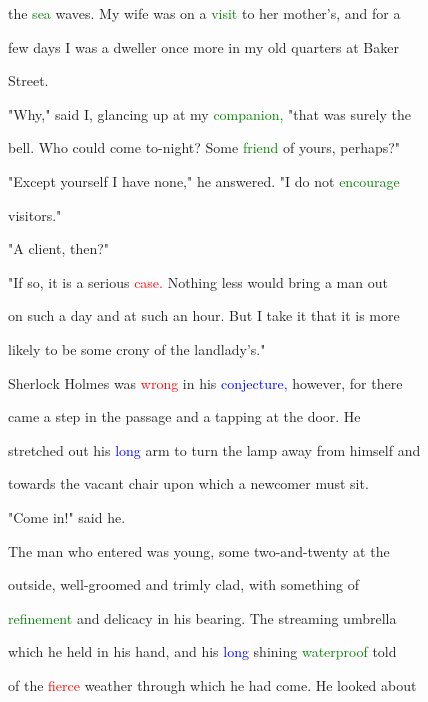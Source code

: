  the \textcolor{green}{sea} waves. My wife was on a \textcolor{green}{visit} to her \textcolor{BurntOrange}{mother's,} and for a

 few days I was a dweller once more in my old quarters at Baker

 Street.



 "Why," said I, glancing up at my \textcolor{green}{companion,} "that was surely the

 bell. Who could come to-night? Some \textcolor{green}{friend} of yours, perhaps?"



 "Except yourself I have none," he answered. "I do not \textcolor{green}{encourage}

 \textcolor{BurntOrange}{visitors."}



 "A client, then?"



 "If so, it is a serious \textcolor{red}{case.} Nothing less would bring a man out

 on such a day and at such an hour. But I take it that it is more

 likely to be some crony of the landlady's."



 Sherlock Holmes was \textcolor{red}{wrong} in his \textcolor{blue}{conjecture,} however, for there

 came a step in the passage and a tapping at the door. He

 stretched out his \textcolor{blue}{long} arm to turn the lamp away from himself and

 towards the vacant chair upon which a \textcolor{BurntOrange}{newcomer} must sit.



 "Come in!" said he.



 The man who entered was \textcolor{BurntOrange}{young,} some two-and-twenty at the

 outside, well-groomed and trimly clad, with something of

 \textcolor{green}{refinement} and delicacy in his bearing. The streaming umbrella

 which he held in his hand, and his \textcolor{blue}{long} shining \textcolor{green}{waterproof} told

 of the \textcolor{red}{fierce} weather through which he had come. He looked about

